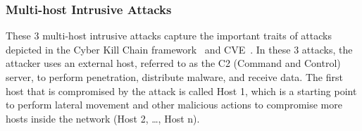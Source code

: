 \subsubsection{Multi-host Intrusive Attacks}
\label{subsubsec:attack-cases}

These 3 multi-host intrusive attacks capture the important traits of attacks depicted in the Cyber Kill Chain framework~\cite{cyberkillchain} and CVE~\cite{cve}. 
In these 3 attacks, the attacker uses an external host, referred to as the C2 (Command and Control) server, to perform penetration, distribute malware, and receive data. 
The first host that is compromised by the attack is called Host 1,
which is a starting point to perform lateral movement and other malicious actions to compromise more hosts inside the network (\ie Host 2, \ldots, Host n). 

